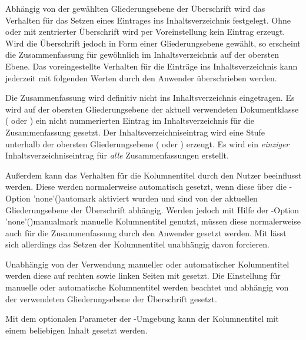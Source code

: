 \begin{DeclareEntity*}{}
\begin{DeclareEntity*}{}
\begin{DeclareEntity*}{}
\begin{Declaration}
Abhängig von der gewählten Gliederungsebene der Überschrift wird das Verhalten 
für das Setzen eines Eintrages ins Inhaltsverzeichnis festgelegt. Ohne oder mit 
zentrierter Überschrift wird per Voreinstellung kein Eintrag erzeugt. Wird die 
Überschrift jedoch in Form einer Gliederungsebene gewählt, so erscheint die 
Zusammenfassung für gewöhnlich im Inhaltsverzeichnis auf der obersten Ebene. 
Das voreingestellte Verhalten für die Einträge ins Inhaltsverzeichnis kann 
jederzeit mit folgenden Werten durch den Anwender überschrieben werden.
\begin{DeclareValues}[Inhaltsverzeichnis]{}
  Die Zusammenfassung wird definitiv nicht ins Inhaltsverzeichnis eingetragen.
  Es wird auf der obersten Gliederungsebene der aktuell verwendeten 
  Dokumentklasse ( oder ) ein nicht 
  nummerierten Eintrag im Inhaltsverzeichnis für die Zusammenfassung gesetzt.
  Der Inhaltsverzeichniseintrag wird eine Stufe unterhalb der obersten 
  Gliederungsebene ( oder ) erzeugt.
  Es wird ein \emph{einziger} Inhaltsverzeichniseintrag für \emph{alle} 
  Zusammenfassungen erstellt.
\end{DeclareValues}

%
%
Außerdem kann das Verhalten für die Kolumnentitel durch den Nutzer beeinflusst 
werden. Diese werden normalerweise automatisch gesetzt, wenn diese über die 
\KOMAScript-Option \Option'none'(){automark} 
aktiviert wurden und sind von der aktuellen Gliederungsebene der Überschrift 
abhängig. Werden jedoch mit Hilfe der \KOMAScript-Option 
\Option'none'(){manualmark} manuelle Kolumnentitel 
genutzt, müssen diese normalerweise auch für die Zusammenfassung durch den 
Anwender gesetzt werden. Mit  lässt sich allerdings 
das Setzen der Kolumnentitel unabhängig davon forcieren.
\begin{DeclareValues}[Kolumnentitel]{}
  Unabhängig von der Verwendung manueller oder automatischer Kolumnentitel 
  werden diese auf rechten sowie linken Seiten mit  gesetzt.
  Die Einstellung für manuelle oder automatische Kolumnentitel werden beachtet 
  und abhängig von der verwendeten Gliederungsebene der Überschrift gesetzt.
\end{DeclareValues}
Mit dem optionalen Parameter  der 
-Umgebung kann der Kolumnentitel mit einem beliebigen 
Inhalt gesetzt werden.


\end{Declaration}
\end{DeclareEntity*}
\end{DeclareEntity*}
\end{DeclareEntity*}
